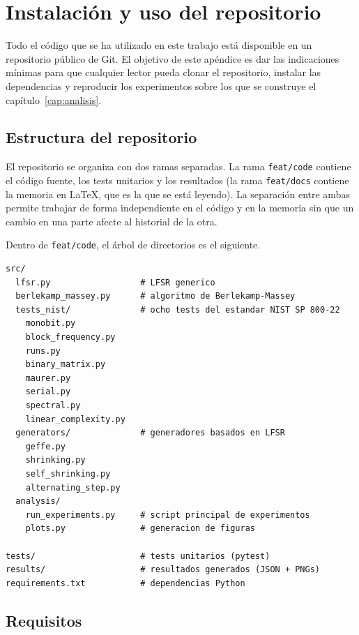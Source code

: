\chapter{Instalación y uso del repositorio}
\label{ap:instalacion}

Todo el código que se ha utilizado en este trabajo está disponible en un repositorio público de Git.
El objetivo de este apéndice es dar las indicaciones mínimas para que cualquier lector pueda clonar el repositorio,
instalar las dependencias y reproducir los experimentos sobre los que se construye el capítulo~\ref{cap:analisis}.

\section{Estructura del repositorio}

El repositorio se organiza con dos ramas separadas. La rama \texttt{feat/code} contiene el código fuente,
los tests unitarios y los resultados (la rama \texttt{feat/docs} contiene la memoria en \LaTeX{}, que es la que se está leyendo).
La separación entre ambas permite trabajar de forma independiente en el código y en la memoria
sin que un cambio en una parte afecte al historial de la otra.

Dentro de \texttt{feat/code}, el árbol de directorios es el siguiente.

\begin{lstlisting}[basicstyle=\small\ttfamily,frame=single,backgroundcolor=\color{gray97},numbers=none]
src/
  lfsr.py                  # LFSR generico
  berlekamp_massey.py      # algoritmo de Berlekamp-Massey
  tests_nist/              # ocho tests del estandar NIST SP 800-22
    monobit.py
    block_frequency.py
    runs.py
    binary_matrix.py
    maurer.py
    serial.py
    spectral.py
    linear_complexity.py
  generators/              # generadores basados en LFSR
    geffe.py
    shrinking.py
    self_shrinking.py
    alternating_step.py
  analysis/
    run_experiments.py     # script principal de experimentos
    plots.py               # generacion de figuras

tests/                     # tests unitarios (pytest)
results/                   # resultados generados (JSON + PNGs)
requirements.txt           # dependencias Python
\end{lstlisting}

\section{Requisitos}


